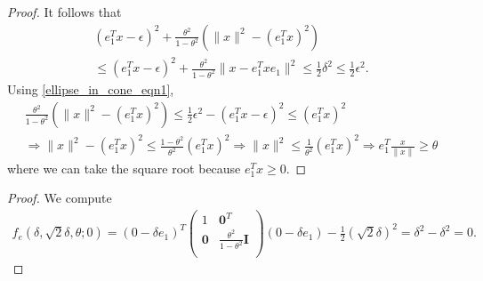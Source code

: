 \begin{proof}
It follows that 
\begin{align*}
(e_1^Tx - \epsilon)^2 + \frac{\theta^2}{1 - \theta^2}\left(\|x\|^2 - (e_1^Tx)^2\right)  \\
\le (e_1^Tx - \epsilon)^2 + \frac{\theta^2}{1 - \theta^2}\|x - e_1^Tx e_1\|^2 \le \frac 1 2 \delta^2 \le \frac 1 2 \epsilon^2.
\end{align*}
Using \cref{ellipse_in_cone_eqn1}, 
\begin{align*}
\frac{\theta^2}{1 - \theta^2}(\|x\|^2 - (e_1^Tx)^2) \le \frac 1 2 \epsilon^2 - (e_1^Tx - \epsilon)^2 \le (e_1^Tx)^2 \\
\Longrightarrow \|x\|^2 - (e_1^Tx)^2 \le \frac{1 - \theta^2}{\theta^2}(e_1^Tx)^2 
\Longrightarrow \|x\|^2 \le \frac 1 {\theta^2}(e_1^Tx)^2
\Longrightarrow e_1^T\frac{x}{\|x\|} \ge \theta
\end{align*}
where we can take the square root because $e_1^Tx \ge 0$.
\end{proof}

\begin{proof}
We compute
\begin{align*}
f_e(\delta, \sqrt{2}\delta, \theta; 0) =(0 - \delta e_1)^T\begin{pmatrix}
1 & \boldsymbol0^T \\
\boldsymbol 0 & \frac{\theta^2}{1 - \theta^2} \boldsymbol I \\
\end{pmatrix}(0 - \delta e_1) - \frac 1 2 (\sqrt 2 \delta)^2
=\delta^2 - \delta^2 = 0.
\end{align*}
\end{proof}


